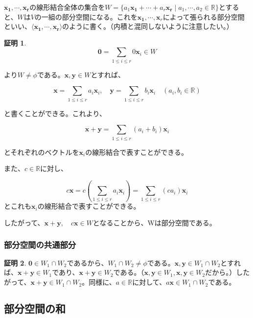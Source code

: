 \documentclass[dvipdfmx,autodetect-engine]{jsarticle}
\theoremstyle{definition}
\newtheorem*{Proof*}{証明}
\begin{document}
$\bm{x_1}, \cdots, \bm{x_r}$の線形結合全体の集合を$W = \{a_1\bm{x_1} + \cdots + a_r\bm{x_r} \mid a_1, \cdots, a_2 \in \mathbb{R} \}$とすると、$W$は$V$の一組の部分空間になる。これを$\bm{x_1}, \cdots, \bm{x}_r$によって張られる部分空間といい、$\langle \bm{x_1}, \cdots, \bm{x_r} \rangle$のように書く。（内積と混同しないように注意したい。）

\begin{Proof*}
$$
\bm{0} = \sum_{1 \leq i \leq r} 0\bm{x}_i \in W
$$

より$W \neq \phi$である。$\bm{x}, \bm{y} \in W$とすれば、

$$
\bm{x} = \sum_{1 \leq i \leq r} a_i\bm{x}_i, \quad \bm{y} = \sum_{1 \leq i \leq r} b_i\bm{x}_i \quad (a_i, b_i \in \mathbb{R})
$$

と書くことができる。これより、

$$
\bm{x} + \bm{y} = \sum_{1 \leq i \leq r} (a_i + b_i)\bm{x}_i
$$

とそれぞれのベクトルを$\bm{x}_i$の線形結合で表すことができる。

また、$c \in \mathbb{R}$に対し、

$$
c\bm{x} = c \left( \sum_{1 \leq i \leq r} a_i\bm{x}_i \right) = \sum_{1 \leq i \leq r} (ca_i)\bm{x}_i
$$とこれも$\bm{x}_i$の線形結合で表すことができる。

したがって、$\bm{x} + \bm{y}, \quad c\bm{x} \in W$となることから、Wは部分空間である。
\end{Proof*}

\subsubsection{部分空間の共通部分}


\begin{Proof*}
$\bm{0} \in W_1 \cap W_2$であるから、$W_1 \cap W_2 \neq \phi$である。$\bm{x}, \bm{y} \in W_1 \cap W_2$とすれば、$\bm{x} + \bm{y} \in W_1$であり、$\bm{x} + \bm{y} \in W_2$である。（$\bm{x}, \bm{y} \in W_1, \bm{x}, \bm{y} \in W_2$だから。）したがって、$\bm{x} + \bm{y} \in W_1 \cap W_2$。同様に、$a \in \mathbb{R}$に対して、$a\bm{x} \in W_1 \cap W_2$である。
\end{Proof*}

\subsection{部分空間の和}
\end{document}
